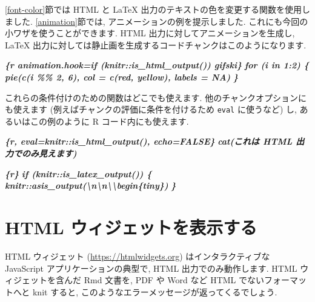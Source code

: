 \documentclass[
  11pt,
  lualatex,
  ja=standard]{bxjsreport}
\newenvironment{Shaded}{\begin{snugshade}}{\end{snugshade}}
\newcommand{\InformationTok}[1]{\textcolor[rgb]{0.56,0.35,0.01}{\textbf{\textit{#1}}}}
\begin{document}
\ref{font-color}節では HTML と LaTeX 出力のテキストの色を変更する関数を使用しました. \ref{animation}節では, アニメーションの例を提示しました. これにも今回の小ワザを使うことができます. HTML 出力に対してアニメーションを生成し, LaTeX 出力に対しては静止画を生成するコードチャンクはこのようになります.

\begin{Shaded}
\begin{Highlighting}[]
\InformationTok{\textasciigrave{}\textasciigrave{}\textasciigrave{}\{r animation.hook=if (knitr::is\_html\_output()) \textquotesingle{}gifski\textquotesingle{}\}}
\InformationTok{for (i in 1:2) \{}
\InformationTok{  pie(c(i \%\% 2, 6), col = c(\textquotesingle{}red\textquotesingle{}, \textquotesingle{}yellow\textquotesingle{}), labels = NA)}
\InformationTok{\}}
\InformationTok{\textasciigrave{}\textasciigrave{}\textasciigrave{}}
\end{Highlighting}
\end{Shaded}

これらの条件付けのための関数はどこでも使えます. 他のチャンクオプションにも使えます (例えばチャンクの評価に条件を付けるため \texttt{eval} に使うなど) し, あるいはこの例のように R コード内にも使えます.

\begin{Shaded}
\begin{Highlighting}[]
\InformationTok{\textasciigrave{}\textasciigrave{}\textasciigrave{}\{r, eval=knitr::is\_html\_output(), echo=FALSE\}}
\InformationTok{cat(\textquotesingle{}これは HTML 出力でのみ見えます\textquotesingle{})}
\InformationTok{\textasciigrave{}\textasciigrave{}\textasciigrave{}}

\InformationTok{\textasciigrave{}\textasciigrave{}\textasciigrave{}\{r\}}
\InformationTok{if (knitr::is\_latex\_output()) \{}
\InformationTok{  knitr::asis\_output(\textquotesingle{}\textbackslash{}n\textbackslash{}n\textbackslash{}\textbackslash{}begin\{tiny\}\textquotesingle{})}
\InformationTok{\}}
\InformationTok{\textasciigrave{}\textasciigrave{}\textasciigrave{}}
\end{Highlighting}
\end{Shaded}

\hypertarget{html-widgets}{%
\section{HTML ウィジェットを表示する}\label{html-widgets}}

HTML ウィジェット (\url{https://htmlwidgets.org}) はインタラクティブな JavaScript アプリケーションの典型で, HTML 出力でのみ動作します. HTML ウィジェットを含んだ Rmd 文書を, PDF や Word など HTML でないフォーマットへと knit すると, このようなエラーメッセージが返ってくるでしょう.
\end{document}
